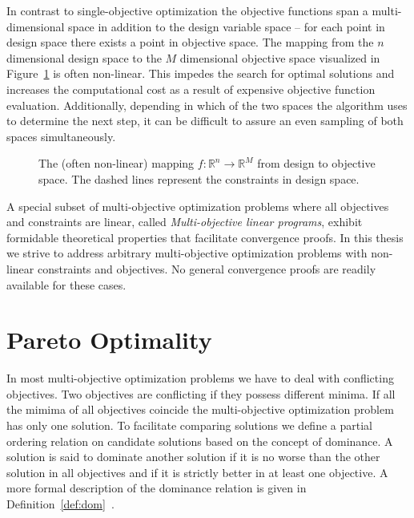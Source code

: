 In contrast to single-objective optimization the objective functions span
  a multi-dimensional space in addition to the design variable space --
  for each point in design space there exists a point in objective space.
The mapping from the $n$ dimensional design space to the $M$ dimensional
  objective space visualized in Figure~\ref{fig:des_to_obj} is often
  non-linear.
This impedes the search for optimal solutions and increases the computational
  cost as a result of expensive objective function evaluation.
Additionally, depending in which of the two spaces the algorithm uses to
  determine the next step, it can be difficult to assure an even sampling of
  both spaces simultaneously.
%
\begin{figure}
  \begin{center}
    \begin{tikzpicture}
%      
    \end{tikzpicture}
  \end{center}
  \caption{The (often non-linear) mapping $f : \mathbb{R}^n \rightarrow
    \mathbb{R}^M$ from design to objective space. The dashed lines represent
    the constraints in design space.
    }
  \label{fig:des_to_obj}
\end{figure}

A special subset of multi-objective optimization problems where all objectives
  and constraints are linear, called \textit{Multi-objective linear programs},
  exhibit formidable theoretical properties that facilitate convergence proofs.
In this thesis we strive to address arbitrary multi-objective optimization
  problems with non-linear constraints and objectives.
No general convergence proofs are readily available for these cases.


\section{Pareto Optimality}

In most multi-objective optimization problems we have to deal with conflicting
  objectives.
Two objectives are conflicting if they possess different minima.
If all the mimima of all objectives coincide the multi-objective optimization
  problem has only one solution.
To facilitate comparing solutions we define a partial ordering relation on
  candidate solutions based on the concept of dominance.
A solution is said to dominate another solution if it is no worse than the
  other solution in all objectives and if it is strictly better in at least
  one objective.
A more formal description of the dominance relation is given in
  Definition~\ref{def:dom}~\cite{deb:09}.

